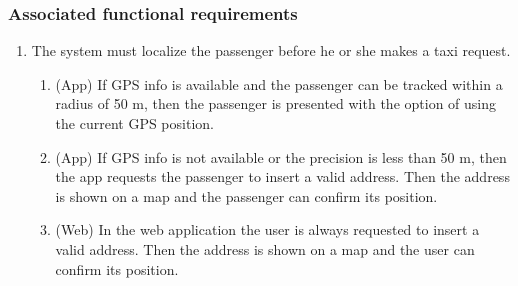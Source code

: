 \subsubsection{Associated functional requirements}
\begin{enumerate}
	\item The system must localize the passenger before he or she makes a taxi request.
	\begin{enumerate}
		\item (App) If GPS info is available and the passenger can be tracked within a radius of 50 m, then the passenger is presented with the option of using the current GPS position.
		\item (App) If GPS info is not available or the precision is less than 50 m, then the app requests the passenger to insert a valid address. Then the address is shown on a map and the passenger can confirm its position.
		\item (Web) In the web application the user is always requested to insert a valid address. Then the address is shown on a map and the user can confirm its position.
	\end{enumerate}


\end{enumerate}

